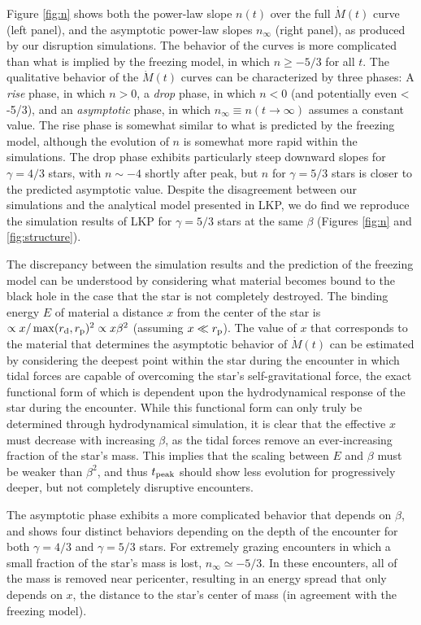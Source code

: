 \documentclass[twocolumn]{emulateapj}
\newcommand{\md}{\dot{M}\left(t\right)}
\newcommand{\tpeak}{t_{\rm peak}}
\newcommand{\ninf}{n_{\infty}}
\newcommand{\lodato}{LKP\xspace}
\begin{document}
Figure \ref{fig:n} shows both the power-law slope $n(t)$ over the full $\md$ curve (left panel), and the asymptotic power-law slopes $\ninf$ (right panel), as produced by our disruption simulations. The behavior of the curves is more complicated than what is implied by the freezing model, in which $n \geq -5/3$ for all $t$. The qualitative behavior of the $\md$ curves can be characterized by three phases: A {\it rise} phase, in which $n > 0$, a {\it drop} phase, in which $n < 0$ (and potentially even < -5/3), and an {\it asymptotic} phase, in which $\ninf \equiv n(t \rightarrow \infty)$ assumes a constant value. The rise phase is somewhat similar to what is predicted by the freezing model, although the evolution of $n$ is somewhat more rapid within the simulations. The drop phase exhibits particularly steep downward slopes for $\gamma = 4/3$ stars, with $n \sim -4$ shortly after peak, but $n$ for $\gamma = 5/3$ stars is closer to the predicted asymptotic value. Despite the disagreement between our simulations and the analytical model presented in \lodato, we do find we reproduce the simulation results of LKP for $\gamma = 5/3$ stars at the same $\beta$ (Figures \ref{fig:n} and \ref{fig:structure}).

The discrepancy between the simulation results and the prediction of the freezing model can be understood by considering what material becomes bound to the black hole in the case that the star is not completely destroyed. The binding energy $E$ of material a distance $x$ from the center of the star is $\propto x / \max(r_{\rm d}, r_{\rm p})^{2} \propto x \beta^{2}$ (assuming $x \ll r_{\rm p}$). The value of $x$ that corresponds to the material that determines the asymptotic behavior of $\md$ can be estimated by considering the deepest point within the star during the encounter in which tidal forces are capable of overcoming the star's self-gravitational force,  the exact functional form of which  is dependent upon the hydrodynamical response of the star during the encounter. While this functional form can only truly be determined through hydrodynamical simulation, it is clear that the effective $x$ must decrease with increasing $\beta$, as the tidal forces remove an ever-increasing fraction of the star's mass. This implies that the scaling between $E$ and $\beta$ must be weaker than $\beta^{2}$, and thus $\tpeak$ should show less evolution for progressively deeper, but not completely disruptive encounters.

The asymptotic phase exhibits a more complicated behavior that depends on $\beta$, and shows four distinct behaviors depending on the depth of the encounter for both $\gamma = 4/3$ and $\gamma = 5/3$ stars. For extremely grazing encounters in which a small fraction of the star's mass is lost, $\ninf \simeq -5/3$. In these encounters, all of the mass is removed near pericenter, resulting in an energy spread that only depends on $x$, the distance to the star's center of mass (in agreement with the freezing model).
\end{document}
